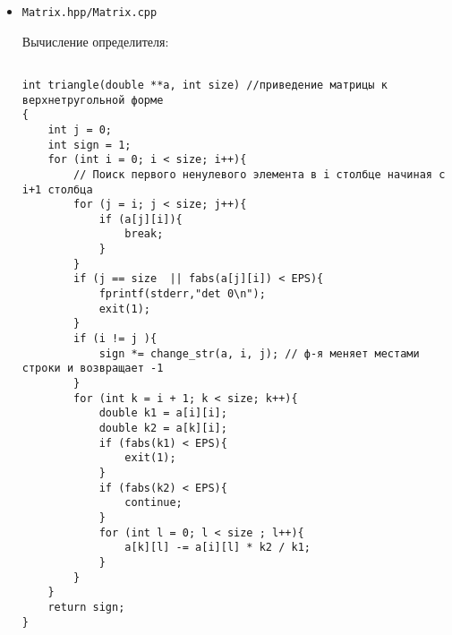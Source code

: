 \documentclass[a4paper,12pt,titlepage,finall]{article}
\begin{document}
\begin{itemize}
\item \begin{verbatim}Matrix.hpp/Matrix.cpp\end{verbatim}

Вычисление определителя:
\begin{lstlisting}

int triangle(double **a, int size) //приведение матрицы к верхнетругольной форме
{
    int j = 0;
    int sign = 1;
    for (int i = 0; i < size; i++){
        // Поиск первого ненулевого элемента в i столбце начиная с i+1 столбца
        for (j = i; j < size; j++){
            if (a[j][i]){
                break;
            }
        }
        if (j == size  || fabs(a[j][i]) < EPS){
            fprintf(stderr,"det 0\n");
            exit(1);
        }
        if (i != j ){
            sign *= change_str(a, i, j); // ф-я меняет местами строки и возвращает -1
        }
        for (int k = i + 1; k < size; k++){
            double k1 = a[i][i];
            double k2 = a[k][i];
            if (fabs(k1) < EPS){
                exit(1);
            }
            if (fabs(k2) < EPS){
                continue;
            }
            for (int l = 0; l < size ; l++){
                a[k][l] -= a[i][l] * k2 / k1;
            }
        }
    }
    return sign;
}


\end{lstlisting}
\end{itemize}
\end{document}
